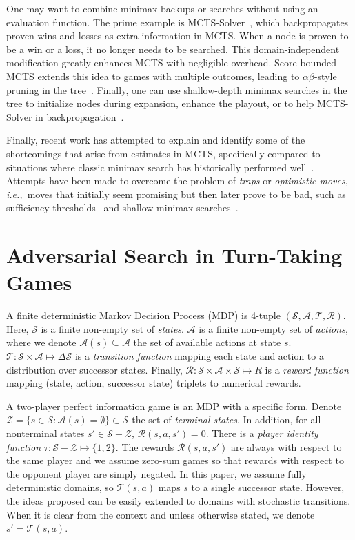 \documentclass{article}
\newcommand{\cA}{\mathcal{A}}
\newcommand{\cR}{\mathcal{R}}
\newcommand{\cS}{\mathcal{S}}
\newcommand{\cT}{\mathcal{T}}
\newcommand{\cZ}{\mathcal{Z}}
\newcommand{\ie}{{\it i.e.,}~}
\begin{document}
One may want to combine minimax backups or searches without using an evaluation function. 
The prime example is MCTS-Solver~\cite{Winands08Solver}, which backpropagates proven wins and losses as 
extra information in MCTS. When a node is proven to be a 
win or a loss, it no longer needs to be searched. This domain-independent modification greatly enhances 
MCTS with negligible overhead. Score-bounded MCTS extends this idea to games with multiple 
outcomes, leading to $\alpha \beta$-style pruning in the tree~\cite{Cazenave10Score}. Finally, one can use shallow-depth
minimax searches in the tree to initialize nodes during expansion, enhance the playout, or to help MCTS-Solver 
in backpropagation~\cite{Baier13MinimaxHybrids}.

Finally, recent work has attempted to explain and identify some of the shortcomings that arise from estimates in 
MCTS, specifically compared to situations where classic minimax search has historically performed 
well~\cite{Ramanujan10Understanding,Ramanujan10On}. 
Attempts have been made to overcome the problem of {\it traps} or {\it optimistic moves}, \ie moves that initially seem 
promising but then later prove to be bad, such as sufficiency 
thresholds~\cite{Gudmundsson13Sufficiency} and shallow minimax searches~\cite{Baier13MinimaxHybrids}. 


\section{Adversarial Search in Turn-Taking Games}

A finite deterministic Markov Decision Process (MDP) is 4-tuple $(\cS, \cA, \cT, \cR)$. Here, $\cS$ is a finite non-empty set of {\it states}. 
$\cA$ is a finite non-empty set of {\it actions}, where we denote $\cA(s) \subseteq \cA$ the set of available actions at state $s$. 
$\cT : \cS \times \cA \mapsto \Delta \cS$ is a {\it transition function} mapping 
each state and action to a distribution over successor states. Finally, $\cR : \cS \times \cA \times \cS \mapsto R$ 
is a {\it reward function} mapping (state, action, successor state) triplets to numerical rewards. 

A two-player perfect information game is an MDP with a specific form.
Denote $\cZ = \{ s \in \cS: \cA(s) = \emptyset \} \subset \cS$ the set of {\it terminal states}. 
In addition, for all nonterminal states $s' \in \cS - \cZ$, $\cR(s,a,s') = 0$. 
There is a {\it player identity function} $\tau : \cS - \cZ \mapsto \{1,2\}$. 
The rewards $\cR(s,a,s')$ are always with respect to the same player and  
we assume zero-sum games so that rewards with respect to the opponent player are simply negated. 
In this paper, we assume fully deterministic domains, so $\cT(s,a)$ maps $s$ to a single successor 
state. 
However, the ideas proposed can be easily extended to domains with stochastic transitions. 
When it is clear from the context and unless otherwise stated, we denote $s' = \cT(s,a)$. 
\end{document}
